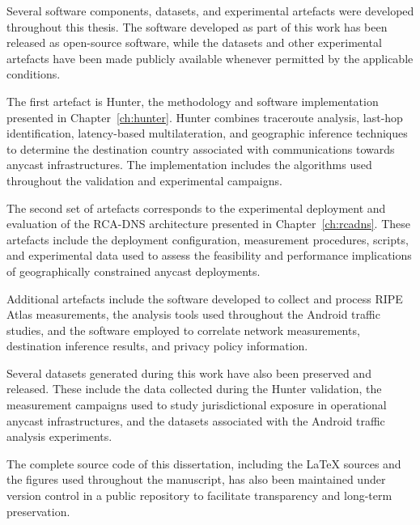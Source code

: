 Several software components, datasets, and experimental artefacts were developed throughout this thesis. The software developed as part of this work has been released as open-source software, while the datasets and other experimental artefacts have been made publicly available whenever permitted by the applicable conditions.

The first artefact is Hunter, the methodology and software implementation presented in Chapter~\ref{ch:hunter}. Hunter combines traceroute analysis, last-hop identification, latency-based multilateration, and geographic inference techniques to determine the destination country associated with communications towards anycast infrastructures. The implementation includes the algorithms used throughout the validation and experimental campaigns.

The second set of artefacts corresponds to the experimental deployment and evaluation of the RCA-DNS architecture presented in Chapter~\ref{ch:rcadns}. These artefacts include the deployment configuration, measurement procedures, scripts, and experimental data used to assess the feasibility and performance implications of geographically constrained anycast deployments.

Additional artefacts include the software developed to collect and process RIPE Atlas measurements, the analysis tools used throughout the Android traffic studies, and the software employed to correlate network measurements, destination inference results, and privacy policy information.

Several datasets generated during this work have also been preserved and released. These include the data collected during the Hunter validation, the measurement campaigns used to study jurisdictional exposure in operational anycast infrastructures, and the datasets associated with the Android traffic analysis experiments.

The complete source code of this dissertation, including the \LaTeX{} sources and the figures used throughout the manuscript, has also been maintained under version control in a public repository to facilitate transparency and long-term preservation.

